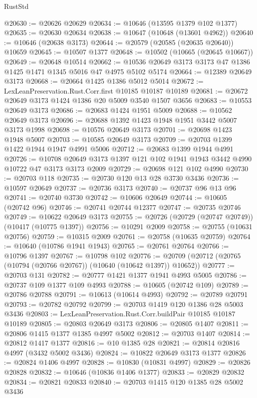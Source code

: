 \begin{lexlean}{RustStd}
\begin{coremodule}
@20630 := @20626 @20629
@20634 := @10646 (@13595 @1379 @102 @1377)
@20635 := @20630 @20634
@20638 := @10647 (@10648 (@13601 @4962))
@20640 := @10646 (@20638 @3173)
@20644 := @20579 (@20585 (@20635 @20640)) @10659
@20645 := @10507 @1377
@20648 := @10502 (@10665 (@20645 @10667))
@20649 := @20648 @10514
@20662 := @10536 @20649 @3173 @3173 @47 @1386 @1425 @1471 @1345 @5016 @47 @4975 @5102 @5174
@20664 := @12389 @20649 @3173
@20668 := @20664 @1425 @1386 @5012 @5014
@20672 := LexLeanPreservation.Rust.Corr.first @10185 @10187 @10189
@20681 := @20672 @20649 @3173 @1424 @1386 @20 @5009 @3540 @1507 @3656
@20683 := @10553 @20649 @3173
@20686 := @20683 @1424 @1951 @5009
@20688 := @10562 @20649 @3173
@20696 := @20688 @1392 @1423 @1948 @1951 @3442 @5007 @3173 @1998
@20698 := @10576 @20649 @3173
@20701 := @20698 @1423 @1948 @5007
@20703 := @10585 @20649 @3173
@20709 := @20703 @1399 @1422 @1944 @1947 @4991 @5006
@20712 := @20683 @1399 @1944 @4991
@20726 := @10708 @20649 @3173 @1397 @121 @102 @1941 @1943 @3442 @4990 @10722 @47 @3173 @3173 @2009
@20729 := @20698 @121 @102 @4990
@20730 := @20703 @118
@20735 := @20730 @120 @13 @28 @3730 @3436
@20736 := @10597 @20649
@20737 := @20736 @3173
@20740 := @20737 @96 @13 @96
@20741 := @20740 @3730
@20742 := @10606 @20649
@20744 := @10605 (@20742 @96)
@20746 := @20741 @20744 @12377
@20747 := @20735 @20746
@20749 := @10622 @20649 @3173
@20755 := @20726 (@20729 (@20747 @20749)) (@10417 (@10775 @1397))
@20756 := @10291 @2009
@20758 := @20755 (@10631 @20756)
@20759 := @10315 @2009
@20761 := @20758 (@10635 @20759)
@20764 := @10640 (@10786 @1941 @1943)
@20765 := @20761 @20764
@20766 := @10796 @1397
@20767 := @10798 @102
@20776 := @20709 (@20712 (@20765 (@10794 (@20766 @20767)) (@10640 (@10642 @1397)) @10652))
@20777 := @20703 @131
@20782 := @20777 @1421 @1377 @1941 @4993 @5005
@20786 := @20737 @109 @1377 @109 @4993
@20788 := @10605 (@20742 @109)
@20789 := @20786 @20788
@20791 := @10613 (@10614 @4993)
@20792 := @20789 @20791
@20793 := @20782 @20792
@20799 := @20703 @1419 @120 @1386 @28 @5003 @3436
@20803 := LexLeanPreservation.Rust.Corr.buildPair @10185 @10187 @10189
@20805 := @20803 @20649 @3173
@20806 := @20805 @1407
@20811 := @20806 @1415 @1377 @1385 @4997 @5002
@20812 := @20703 @1407
@20814 := @20812 @1417 @1377
@20816 := @10 @1385 @28
@20821 := @20814 @20816 @4997 (@3432 @5002 @3436)
@20824 := @10822 @20649 @3173 @1377
@20826 := @20824 @1406 @4997
@20828 := @10830 (@10831 @4997)
@20829 := @20826 @20828
@20832 := @10646 (@10836 @1406 @1377)
@20833 := @20829 @20832
@20834 := @20821 @20833
@20840 := @20703 @1415 @120 @1385 @28 @5002 @3436

\end{coremodule}
\end{lexlean}
